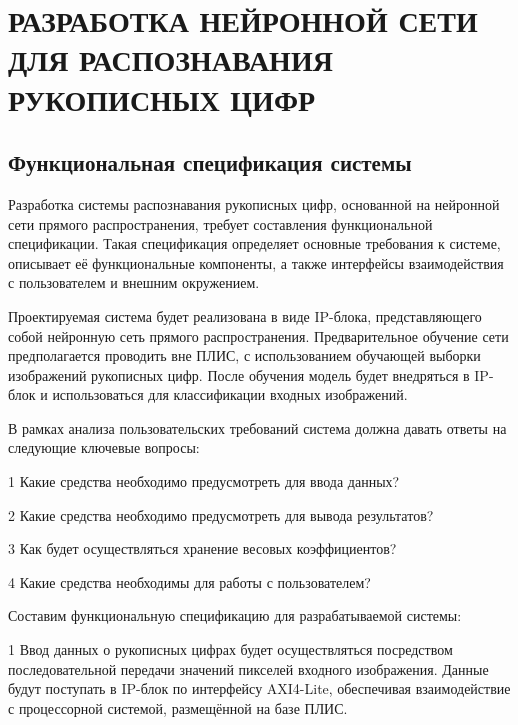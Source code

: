 \chapter[Разработка нейронной сети для распознавания рукописных цифр]
{РАЗРАБОТКА НЕЙРОННОЙ СЕТИ ДЛЯ РАСПОЗНАВАНИЯ РУКОПИСНЫХ ЦИФР}

\section{Функциональная спецификация системы}\par
\hspace*{12.5 mm}Разработка системы распознавания рукописных цифр, основанной 
на нейронной сети прямого распространения, требует составления функциональной 
спецификации. Такая спецификация определяет основные требования к системе, 
описывает её функциональные компоненты, а также интерфейсы взаимодействия с 
пользователем и внешним окружением.

Проектируемая система будет реализована в виде IP-блока, представляющего собой 
нейронную сеть прямого распространения. Предварительное обучение сети 
предполагается проводить вне ПЛИС, с использованием обучающей выборки 
изображений рукописных цифр. После обучения модель будет внедряться в IP-блок и 
использоваться для классификации входных изображений.

В рамках анализа пользовательских требований система должна давать ответы на 
следующие ключевые вопросы:

  1 Какие средства необходимо предусмотреть для ввода данных?

  2 Какие средства необходимо предусмотреть для вывода результатов?

  3 Как будет осуществляться хранение весовых коэффициентов?

  4 Какие средства необходимы для работы с пользователем?

Составим функциональную спецификацию для разрабатываемой системы:

  1 Ввод данных о рукописных цифрах будет осуществляться посредством 
последовательной передачи значений пикселей входного изображения. Данные будут 
поступать в IP-блок по интерфейсу AXI4-Lite, обеспечивая взаимодействие с 
процессорной системой, размещённой на базе ПЛИС.

